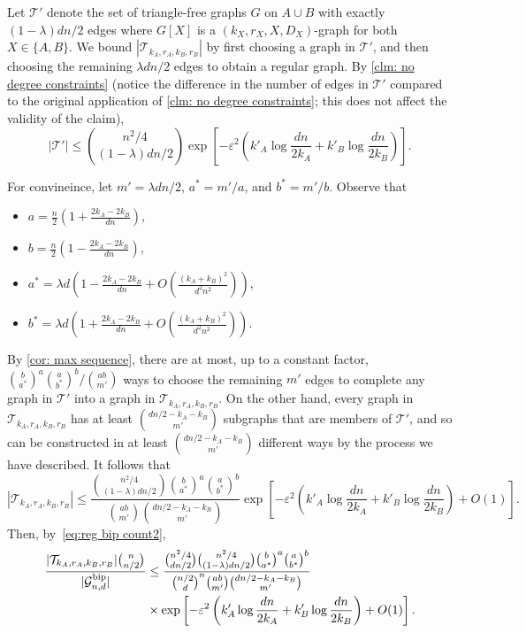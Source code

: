 \documentclass[11pt]{article}
\theoremstyle{plain}
\newtheorem{claim}{Claim}[thm]
\begin{document}
Let $\mathcal T'$ denote the set of triangle-free graphs $G$ on $A \cup B$ with exactly $(1 - \lambda )dn/2$ edges where $G[X]$ is a $(k_X, r_X, X, D_{X})$-graph for both $X \in \{A, B\}$.
    We bound $|\mathcal T_{ k_A, r_A, k_B, r_B}|$ by first choosing a graph in $\mathcal T'$, and then choosing the remaining $\lambda  dn/2$ edges to obtain a regular graph. By \cref{clm: no degree constraints} (notice the difference in the number of edges in  $\mathcal{T}'$ compared to the original application of \cref{clm: no degree constraints}; this does not affect the validity of the claim),
    \begin{equation}
    |\mathcal T'| \leq \binom{n^2/4}{(1-\lambda )dn/2}\exp\left[-\varepsilon^2\left(k'_A\log\frac{dn}{2k_A} + k'_B\log\frac{dn}{2k_B}\right)\right]. \label{eq:no degree constraints 2}
    \end{equation}

For convineince, let $m' = \lambda  dn/2$, $a^* = m'/a$, and $b^* = m'/b$.
    Observe that 
    \begin{itemize}
        \item $a = \frac{n}{2}\left(1 + \frac{2k_A - 2k_B}{dn}\right)$,
        \item $b = \frac{n}{2}\left(1 - \frac{2k_A - 2k_B}{dn}\right)$,
        \item $a^* = \lambda  d\left(1 - \frac{2k_A - 2k_B}{dn} + O\left(\frac{(k_A + k_B)^2}{d^2n^2}\right)\right)$,
        \item $b^* = \lambda  d\left(1 + \frac{2k_A - 2k_B}{dn} + O\left(\frac{(k_A + k_B)^2}{d^2n^2}\right)\right)$.
    \end{itemize}

By \cref{cor: max sequence}, there are at most, up to a constant factor, 
$
\binom{b}{a^*}^a\binom{a}{b^*}^b/\binom{ab}{m'}
$
ways to choose the remaining $m'$ edges to complete any graph in ${\mathcal T}'$ into a graph in $\mathcal T_{k_A, r_A, k_B, r_B}$. On the other hand, every graph in $\mathcal T_{k_A, r_A, k_B, r_B}$ has at least $\binom{dn/2 - k_A - k_B}{m'}$ subgraphs that are members of ${\mathcal T}'$, and so can be constructed in at least $\binom{dn/2 - k_A - k_B}{m'}$ different ways by the process we have described. It follows that
\[
|\mathcal T_{k_A, r_A, k_B, r_B}|\le \frac{\binom{n^2/4}{(1 - \lambda )dn/2}\binom{b}{a^*}^a\binom{a}{b^*}^b}{\binom{ab}{m'}\binom{dn/2 - k_A - k_B}{m'}}\exp\left[-{\varepsilon^2}\left(k'_A\log \frac{dn}{2k_A} + k'_B\log\frac{dn}{2k_B}\right)+O(1)\right].
\]
    Then, by~\eqref{eq:reg bip count2},
    \begin{align}
        \frac{|\mathcal T_{k_A, r_A, k_B, r_B}|\binom{n}{n/2}}{|\mathcal G_{n,d}^{\text{bip}}|} &\leq \frac{\binom{n^2/4}{dn/2}\binom{n^2/4}{(1 - \lambda )dn/2}\binom{b}{a^*}^a\binom{a}{b^*}^b}{\binom{n/2}{d}^n\binom{ab}{m'}\binom{dn/2 - k_A - k_B}{m'}}\notag\\
        &\times\exp\left[-{\varepsilon^2}\left(k'_A\log \frac{dn}{2k_A} + k'_B\log\frac{dn}{2k_B}\right)+O(1)\right]. \label{eq: large k initial ineq}
    \end{align}
\end{document}

